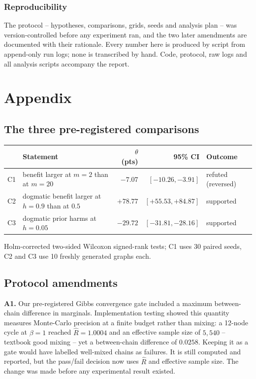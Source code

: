 \documentclass{article}
\begin{document}
\subsubsection*{Reproducibility}

The protocol -- hypotheses, comparisons, grids, seeds and analysis plan -- was version-controlled
before any experiment ran, and the two later amendments are documented with their rationale.
Every number here is produced by script from append-only run logs; none is transcribed by hand.
Code, protocol, raw logs and all analysis scripts accompany the report.




\appendix
\section{Appendix}

\subsection{The three pre-registered comparisons}

\begin{center}
\small
\begin{tabular}{llrrl}
\toprule
& Statement & $\theta$ (pts) & 95\% CI & Outcome \\
\midrule
C1 & benefit larger at $m{=}2$ than at $m{=}20$ & $-7.07$ & $[-10.26,-3.91]$ & refuted (reversed) \\
C2 & dogmatic benefit larger at $h{=}0.9$ than at $0.5$ & $+78.77$ & $[+55.53,+84.87]$ & supported \\
C3 & dogmatic prior harms at $h{=}0.05$ & $-29.72$ & $[-31.81,-28.16]$ & supported \\
\bottomrule
\end{tabular}
\end{center}
Holm-corrected two-sided Wilcoxon signed-rank tests; C1 uses 30 paired seeds, C2 and C3 use 10
freshly generated graphs each.

\subsection{Protocol amendments}

\textbf{A1.} Our pre-registered Gibbs convergence gate included a maximum between-chain
difference in marginals. Implementation testing showed this quantity measures Monte-Carlo
precision at a finite budget rather than mixing: a 12-node cycle at $\beta=1$ reached
$\hat{R}=1.0004$ and an effective sample size of $5{,}540$ -- textbook good mixing -- yet a
between-chain difference of $0.0258$. Keeping it as a gate would have labelled well-mixed chains
as failures. It is still computed and reported, but the pass/fail decision now uses $\hat{R}$ and
effective sample size. The change was made before any experimental result existed.
\end{document}
